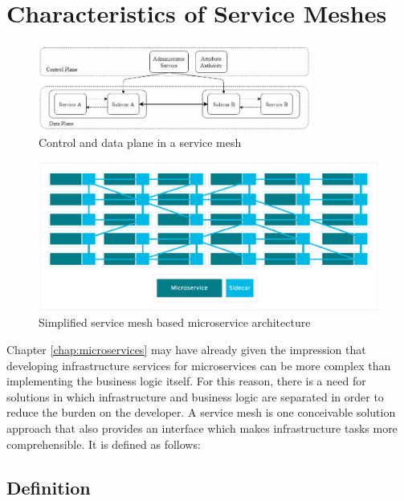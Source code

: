 \section{Characteristics of Service Meshes}

\begin{figure}
    \centering
    \includegraphics[width=0.8\textwidth]{img/mesh_detailed.JPG}
    \caption{Control and data plane in a service mesh\cite{sm4}}
    \label{fig:detailed mesh}
\end{figure}


\begin{figure}
    \includegraphics[width=\columnwidth]{img/mesh.png}
    \caption{Simplified service mesh based microservice architecture \cite{sm2}}
    \label{fig:overview}
\end{figure}

Chapter \ref{chap:microservices} may have already given the impression that developing infrastructure services for microservices can be more complex than implementing the business logic itself. For this reason, there is a need for solutions in which infrastructure and business logic are separated in order to reduce the burden on the developer. A service mesh is one conceivable solution approach that also provides an interface which makes infrastructure tasks more comprehensible. It is defined as follows:

\subsection{Definition}


